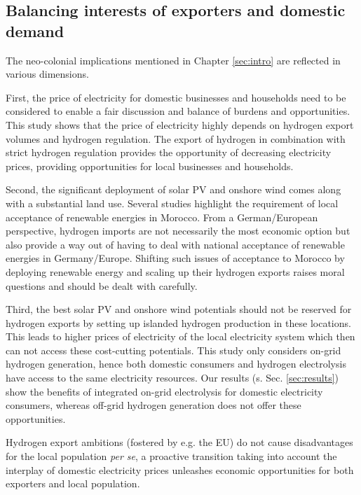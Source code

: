 \subsection{Balancing interests of exporters and domestic demand}
\label{subsec:neocolonial}
The neo-colonial implications mentioned in Chapter \ref{sec:intro} are reflected in various dimensions. 

First, the price of electricity for domestic businesses and households need to be considered to enable a fair discussion and balance of burdens and opportunities. This study shows that the price of electricity highly depends on hydrogen export volumes and hydrogen regulation. The export of hydrogen in combination with strict hydrogen regulation provides the opportunity of decreasing electricity prices, providing opportunities for local businesses and households.

Second, the significant deployment of solar PV and onshore wind comes along with a substantial land use. Several studies \cite{Terrapon-Pfaff2019, Hanger2016} highlight the requirement of local acceptance of renewable energies in Morocco. From a German/European perspective, hydrogen imports are not necessarily the most economic option but also provide a way out of having to deal with national acceptance of renewable energies in Germany/Europe. %
Shifting such issues of acceptance to Morocco by deploying renewable energy and scaling up their hydrogen exports raises moral questions and should be dealt with carefully. %


Third, the best solar PV and onshore wind potentials should not be reserved for hydrogen exports by setting up islanded hydrogen production in these locations. This leads to higher prices of electricity of the local electricity system which then can not access these cost-cutting potentials. This study only considers on-grid hydrogen generation, hence both domestic consumers and hydrogen electrolysis have access to the same electricity resources. Our results (s. Sec. \ref{sec:results}) show the benefits of integrated on-grid electrolysis for domestic electricity consumers, whereas off-grid hydrogen generation does not offer these opportunities.


Hydrogen export ambitions (fostered by e.g. the EU) do not cause disadvantages for the local population \textit{per se}, a proactive transition taking into account the interplay of domestic electricity prices unleashes economic opportunities for both exporters and local population.

